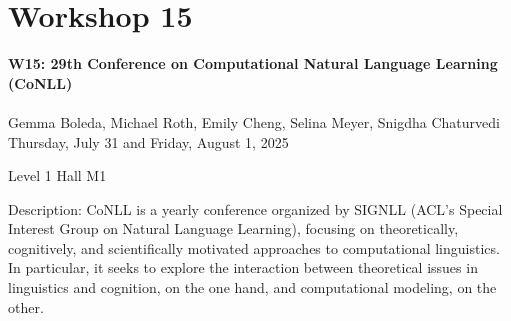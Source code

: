 \clearpage


\section[W15: 29th Conference on Computational Natural Language Learning (CoNLL)]{Workshop 15}
\label{workshop_15_1}
\label{workshop_15_2}

\begin{center}
    {\Large \textbf{W15: 29th Conference on Computational Natural Language Learning (CoNLL)}}\\
\\

    Gemma Boleda, Michael Roth, Emily Cheng, Selina Meyer, Snigdha Chaturvedi\\
    
    Thursday, July 31 and Friday, August 1, 2025
    
    Level 1 Hall M1

\end{center}

Description: CoNLL is a yearly conference organized by SIGNLL (ACL's Special Interest Group on Natural Language Learning), focusing on theoretically, cognitively, and scientifically motivated approaches to computational linguistics.  In particular, it seeks to explore the interaction between theoretical issues in linguistics and cognition, on the one hand, and computational modeling, on the other.

